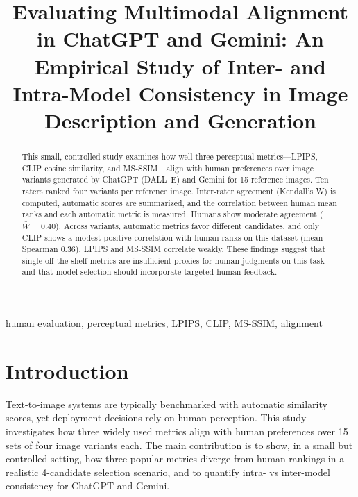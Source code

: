 \documentclass[conference]{IEEEtran}
\begin{document}
\title{Evaluating Multimodal Alignment in ChatGPT and
Gemini: An Empirical Study of Inter- and
Intra-Model Consistency in Image Description and
Generation}

\author{
}
   
\maketitle 

\begin{abstract}
This small, controlled study examines how well three perceptual metrics---LPIPS, CLIP cosine similarity, and MS-SSIM---align with human preferences over image variants generated by ChatGPT (DALL--E) and Gemini for 15 reference images. Ten raters ranked four variants per reference image. Inter-rater agreement (Kendall's W) is computed, automatic scores are summarized, and the correlation between human mean ranks and each automatic metric is measured. Humans show moderate agreement ($\bar{W}=0.40$). Across variants, automatic metrics favor different candidates, and only CLIP shows a modest positive correlation with human ranks on this dataset (mean Spearman $0.36$). LPIPS and MS-SSIM correlate weakly. These findings suggest that single off-the-shelf metrics are insufficient proxies for human judgments on this task and that model selection should incorporate targeted human feedback.
\end{abstract}

\begin{IEEEkeywords}
human evaluation, perceptual metrics, LPIPS, CLIP, MS-SSIM, alignment
\end{IEEEkeywords}
 
\section{Introduction}
Text-to-image systems are typically benchmarked with automatic similarity scores, yet deployment decisions rely on human perception. This study investigates how three widely used metrics align with human preferences over 15 sets of four image variants each. The main contribution is to show, in a small but controlled setting, how three popular metrics diverge from human rankings in a realistic 4-candidate selection scenario, and to quantify intra- vs inter-model consistency for ChatGPT and Gemini.
\end{document}
